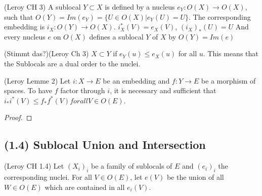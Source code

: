 \begin{definition}[Sublocal]
(Leroy CH 3)
    \label{def:sublocal}
    \leanok
    A sublocal $Y \subset X$ is defined by a nucleus $e_Y: O(X) \rightarrow O(X)$, such that $O(Y) = Im(e_Y) = \{U \in O(X) | e_Y(U) = U\}$.
    The corresponding embedding is $i_X : O(Y) \rightarrow O(X)$. $i^*_X(V) = e_X(V)$, $(i_X)_*(U) = U$
    And every nucleus $e$ on $O(X)$ defines a sublocal $Y$ of $X$ by $O(Y) = Im(e)$
\end{definition}

\begin{definition}
(Stimmt das?)(Leroy Ch 3)
    \label{def:sublocal_inclusion}
    \leanok
    $X \subset Y$ if $e_Y(u) \le e_X(u)$ for all $u$. This means that the Sublocals are a dual order to the nuclei.
\end{definition}


\begin{lemma}[factorisation]
(Leroy Lemme 2)
    \label{lem:factorisation}
    \leanok
    Let $i : X \rightarrow E$ be an embedding and $f: Y \rightarrow E$ be a morphism of spaces. To have $f$ factor through $i$, it is necessary and sufficient that $i_*i^*(V) \le f_*f^*(V) for all V \in O(E)$.
\end{lemma}
\begin{proof}
    \leanok
\end{proof}

\subsection{(1.4) Sublocal Union and Intersection}

\begin{definition}
(Leroy CH 1.4)
    \label{def:sublocal_union}
    \leanok
    Let $(X_i)_i$ be a family of sublocals of $E$ and $(e_i)_i$ the corresponding nuclei.
    For all $V \in O(E)$, let $e(V)$ be the union of all $W \in O(E)$ which are contained in all $e_i(V)$.
\end{definition}

